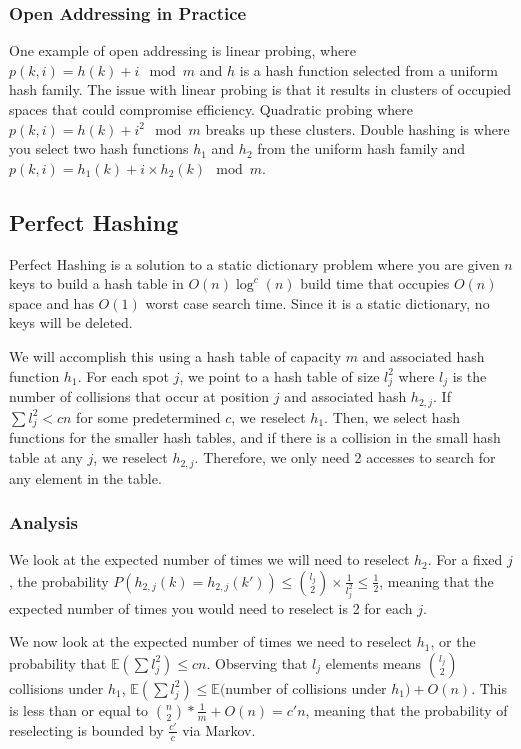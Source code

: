 \documentclass[10pt]{article}
\begin{document}
\subsubsection*{Open Addressing in Practice}
One example of open addressing is linear probing, where $p(k, i) = h(k) + i \mod m$ and $h$ is a hash function selected from a uniform hash family. The issue with linear probing is that it results in clusters of occupied spaces that could compromise efficiency. Quadratic probing where $p(k, i) = h(k) + i^2 \mod m$ breaks up these clusters. Double hashing is where you select two hash functions $h_1$ and $h_2$ from the uniform hash family and $p(k, i) = h_1(k) + i\times h_2(k) \mod m$.
\subsection*{Perfect Hashing}
Perfect Hashing is a solution to a static dictionary problem where you are given $n$ keys to build a hash table in $O(n) \log ^c (n)$ build time that occupies $O(n)$ space and has $O(1)$ worst case search time. Since it is a static dictionary, no keys will be deleted.

We will accomplish this using a hash table of capacity $m$ and associated hash function $h_1$. For each spot $j$, we point to a hash table of size $l_j^2$ where $l_j$ is the number of collisions that occur at position $j$ and associated hash $h_{2,j}$. If $\sum l_j^2 < cn$ for some predetermined $c$, we reselect $h_1$. Then, we select hash functions for the smaller hash tables, and if there is a collision in the small hash table at any $j$, we reselect $h_{2, j}$. Therefore, we only need 2 accesses to search for any element in the table.
\subsubsection*{Analysis}
We look at the expected number of times we will need to reselect $h_2$. For a fixed $j$, the probability $P(h_{2, j}(k) = h_{2, j}(k')) \leq {l_j \choose 2} \times \frac{1}{l_j^2} \leq \frac{1}{2}$, meaning that the expected number of times you would need to reselect is 2 for each $j$.

We now look at the expected number of times we need to reselect $h_1$, or the probability that $\mathbb{E}(\sum l_j^2) \leq c n$. Observing that $l_j$ elements means $l_j \choose 2$ collisions under $h_1$, $\mathbb{E}(\sum l_j^2) \leq \mathbb{E}($number of collisions under $h_1) + O(n)$. This is less than or equal to ${n \choose 2}*\frac{1}{m} + O(n) = c' n$, meaning that the probability of reselecting is bounded by $\frac{c'}{c}$ via Markov.
\end{document}
